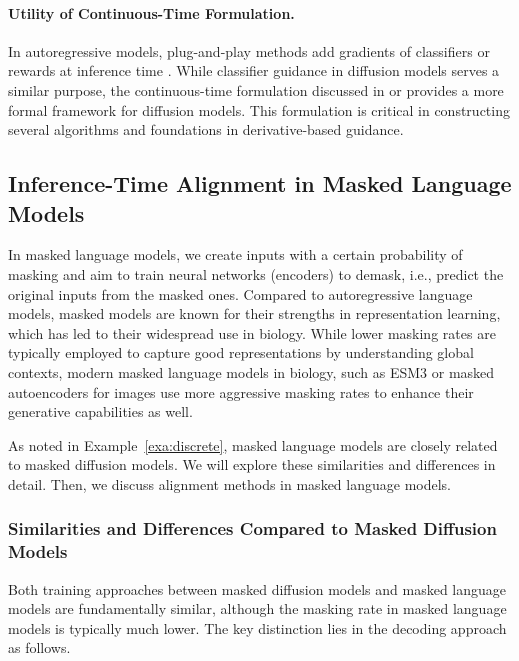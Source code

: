 {\paragraph{Utility of Continuous-Time Formulation.}

In autoregressive models, plug-and-play methods add gradients of classifiers or rewards at inference time \citep{dathathri2019plug, qin2022cold}. While classifier guidance in diffusion models serves a similar purpose, the continuous-time formulation discussed in  or  provides a more formal framework for diffusion models. This formulation is critical in constructing several algorithms and foundations in derivative-based guidance.  

\subsection{Inference-Time Alignment in Masked Language Models}

{ In masked language models, we create inputs with a certain probability of masking and aim to train neural networks (encoders) to demask, i.e., predict the original inputs from the masked ones. Compared to autoregressive language models, masked models are known for their strengths in representation learning, which has led to their widespread use in biology. While lower masking rates are typically employed to capture good representations by understanding global contexts, modern masked language models in biology, such as ESM3 \citep{hayes2024simulating} or masked autoencoders for images \citep{he2022masked} use more aggressive masking rates to enhance their generative capabilities as well.

As noted in Example~\ref{exa:discrete}, masked language models are closely related to masked diffusion models. We will explore these similarities and differences in detail. Then, we discuss alignment methods in masked language models.


\subsubsection{Similarities and Differences Compared to Masked Diffusion Models} 

Both training approaches between masked diffusion models and masked language models are fundamentally similar, although the masking rate in masked language models is typically much lower. The key distinction lies in the decoding approach as follows. 

}}
